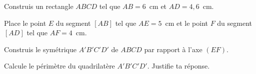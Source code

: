 \begin{myenumerate}
  \item Construis un rectangle $ABCD$ tel que $AB=6$~cm et $AD=4,6$~cm.
  \item Place le point $E$ du segment $[AB]$ tel que $AE=5$~cm et le point $F$ du segment $[AD]$ tel que $AF=4$~cm.
  \item Construis le symétrique $A'B'C'D'$ de $ABCD$ par rapport à l'axe $(EF)$.
  \item Calcule le périmètre du quadrilatère $A'B'C'D'$. Justifie ta réponse.
\end{myenumerate}